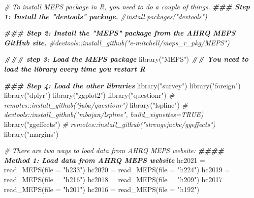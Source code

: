 \documentclass[
]{book}
\newenvironment{Shaded}{\begin{snugshade}}{\end{snugshade}}
\newcommand{\AttributeTok}[1]{\textcolor[rgb]{0.77,0.63,0.00}{#1}}
\newcommand{\CommentTok}[1]{\textcolor[rgb]{0.56,0.35,0.01}{\textit{#1}}}
\newcommand{\DocumentationTok}[1]{\textcolor[rgb]{0.56,0.35,0.01}{\textbf{\textit{#1}}}}
\newcommand{\FunctionTok}[1]{\textcolor[rgb]{0.00,0.00,0.00}{#1}}
\newcommand{\NormalTok}[1]{#1}
\newcommand{\OtherTok}[1]{\textcolor[rgb]{0.56,0.35,0.01}{#1}}
\newcommand{\StringTok}[1]{\textcolor[rgb]{0.31,0.60,0.02}{#1}}
\begin{document}
\begin{Shaded}
\begin{Highlighting}[]
\CommentTok{\# To install MEPS package in R, you need to do a couple of things.}
\DocumentationTok{\#\#\# Step 1: Install the "devtools" package. }
\CommentTok{\#install.packages("devtools")}

\DocumentationTok{\#\#\# Step 2: Install the "MEPS" package from the AHRQ MEPS GitHub site. }
\CommentTok{\#devtools::install\_github("e{-}mitchell/meps\_r\_pkg/MEPS")}

\DocumentationTok{\#\#\# step 3: Load the MEPS package}
\FunctionTok{library}\NormalTok{(}\StringTok{"MEPS"}\NormalTok{) }\DocumentationTok{\#\# You need to load the library every time you restart R}

\DocumentationTok{\#\#\# Step 4: Load the other libraries}
\FunctionTok{library}\NormalTok{(}\StringTok{"survey"}\NormalTok{)}
\FunctionTok{library}\NormalTok{(}\StringTok{"foreign"}\NormalTok{)}
\FunctionTok{library}\NormalTok{(}\StringTok{"dplyr"}\NormalTok{)}
\FunctionTok{library}\NormalTok{(}\StringTok{"ggplot2"}\NormalTok{)}
\FunctionTok{library}\NormalTok{(}\StringTok{"questionr"}\NormalTok{) }\CommentTok{\# remotes::install\_github("juba/questionr")}
\FunctionTok{library}\NormalTok{(}\StringTok{"lspline"}\NormalTok{)  }\CommentTok{\# devtools::install\_github("mbojan/lspline", build\_vignettes=TRUE)}
\FunctionTok{library}\NormalTok{(}\StringTok{"ggeffects"}\NormalTok{) }\CommentTok{\# remotes::install\_github("strengejacke/ggeffects")}
\FunctionTok{library}\NormalTok{(}\StringTok{"margins"}\NormalTok{)}


\CommentTok{\# There are two ways to load data from AHRQ MEPS website:}
\DocumentationTok{\#\#\#\# Method 1: Load data from AHRQ MEPS website}
\NormalTok{hc2021 }\OtherTok{=} \FunctionTok{read\_MEPS}\NormalTok{(}\AttributeTok{file =} \StringTok{"h233"}\NormalTok{)}
\NormalTok{hc2020 }\OtherTok{=} \FunctionTok{read\_MEPS}\NormalTok{(}\AttributeTok{file =} \StringTok{"h224"}\NormalTok{)}
\NormalTok{hc2019 }\OtherTok{=} \FunctionTok{read\_MEPS}\NormalTok{(}\AttributeTok{file =} \StringTok{"h216"}\NormalTok{)}
\NormalTok{hc2018 }\OtherTok{=} \FunctionTok{read\_MEPS}\NormalTok{(}\AttributeTok{file =} \StringTok{"h209"}\NormalTok{)}
\NormalTok{hc2017 }\OtherTok{=} \FunctionTok{read\_MEPS}\NormalTok{(}\AttributeTok{file =} \StringTok{"h201"}\NormalTok{)}
\NormalTok{hc2016 }\OtherTok{=} \FunctionTok{read\_MEPS}\NormalTok{(}\AttributeTok{file =} \StringTok{"h192"}\NormalTok{)}



\end{Highlighting}
\end{Shaded}
\end{document}
